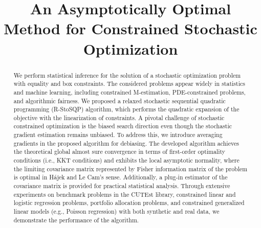 \documentclass[aos]{imsart}
\numberwithin{equation}{section}
\theoremstyle{plain}
\begin{document}
\begin{frontmatter}

\title{An Asymptotically Optimal Method for Constrained Stochastic Optimization}


\begin{abstract}
We perform statistical inference for the solution of a stochastic optimization problem with equality and box constraints. The considered problems appear widely in statistics and machine learning, including constrained M-estimation, PDE-constrained problems, and algorithmic fairness. 
We proposed a relaxed stochastic sequential quadratic programming (R-StoSQP) algorithm, which performs the quadratic expansion of the objective with the linearization of constraints. A pivotal challenge of stochastic constrained optimization is the biased search direction even though the stochastic gradient estimation remains unbiased. To address this, we introduce averaging gradients in the proposed algorithm for debiasing. The developed algorithm achieves the theoretical global almost sure convergence in terms of first-order optimality conditions (i.e., KKT conditions) and exhibits the local asymptotic normality, where the limiting covariance matrix represented by Fisher information matrix of the problem is optimal in  H\'ajek and Le Cam's sense. Additionally, a plug-in estimator of the covariance matrix is provided for practical statistical analysis. Through extensive experiments on benchmark problems in the CUTEst library, constrained linear and logistic regression problems, portfolio allocation problems, and constrained generalized linear models (e.g., Poisson regression) with both synthetic and real data, we demonstrate the performance of the algorithm.
\end{abstract}


\end{frontmatter}
\end{document}
